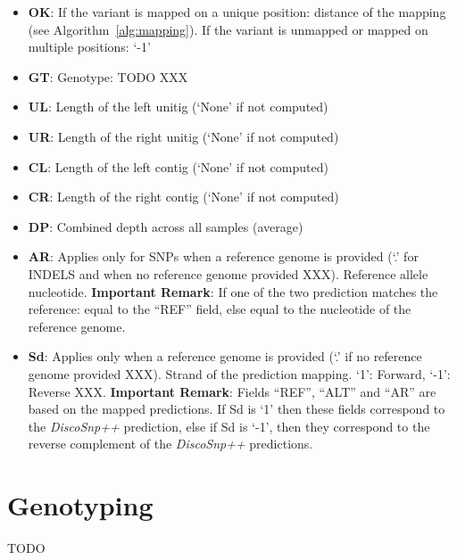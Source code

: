 \documentclass{bmcart}
\newcommand{\discopp}{{\it DiscoSnp++}\xspace}
\begin{document}
\begin{itemize}
\begin{itemize}
		\item \textbf{OK}: 
			If the variant is mapped on a unique position: distance of the mapping (see Algorithm~\ref{alg:mapping}). If the variant is unmapped or mapped on multiple positions: `-1'
		\item \textbf{GT}: Genotype: TODO XXX
		\item \textbf{UL}: Length of the left unitig (`None' if not computed)
		\item \textbf{UR}: Length of the right unitig (`None' if not computed)
		\item \textbf{CL}: Length of the left contig (`None' if not computed)
		\item \textbf{CR}: Length of the right contig (`None' if not computed)
		\item \textbf{DP}: Combined depth across all samples (average)
		\item \textbf{AR}: Applies only for SNPs when a reference genome is provided (`.' for INDELS and when no reference genome provided XXX). Reference allele nucleotide.   \textbf{Important Remark}: If one of the two prediction matches the reference: equal to the ``REF'' field, else equal to the nucleotide of the reference genome.
		\item \textbf{Sd}: Applies only when a reference genome is provided (`.' if no reference genome provided XXX). Strand of the prediction mapping. `1': Forward, `-1': Reverse XXX. \textbf{Important Remark}: Fields ``REF'', ``ALT'' and ``AR'' are based on the mapped predictions. If Sd is `1' then these fields correspond to the \discopp prediction, else if Sd is `-1', then they correspond to the reverse complement of the \discopp predictions. 
		
	\end{itemize}
		
	
\end{itemize}

\section{Genotyping} %
TODO

\end{document}
